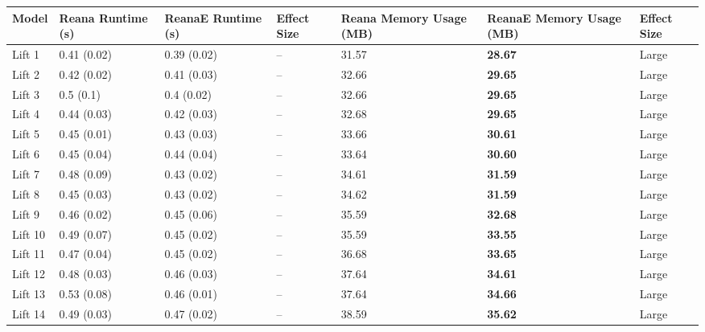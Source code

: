 \begin{tabular}{lllllll}
\toprule
   Model & Reana Runtime (s) & ReanaE Runtime (s) & Effect Size & Reana Memory Usage (MB) & ReanaE Memory Usage (MB) & Effect Size \\
\midrule
  Lift 1 &       0.41 (0.02) &        0.39 (0.02) &          -- &                   31.57 &           \textbf{28.67} &       Large \\
  Lift 2 &       0.42 (0.02) &        0.41 (0.03) &          -- &                   32.66 &           \textbf{29.65} &       Large \\
  Lift 3 &         0.5 (0.1) &         0.4 (0.02) &          -- &                   32.66 &           \textbf{29.65} &       Large \\
  Lift 4 &       0.44 (0.03) &        0.42 (0.03) &          -- &                   32.68 &           \textbf{29.65} &       Large \\
  Lift 5 &       0.45 (0.01) &        0.43 (0.03) &          -- &                   33.66 &           \textbf{30.61} &       Large \\
  Lift 6 &       0.45 (0.04) &        0.44 (0.04) &          -- &                   33.64 &           \textbf{30.60} &       Large \\
  Lift 7 &       0.48 (0.09) &        0.43 (0.02) &          -- &                   34.61 &           \textbf{31.59} &       Large \\
  Lift 8 &       0.45 (0.03) &        0.43 (0.02) &          -- &                   34.62 &           \textbf{31.59} &       Large \\
  Lift 9 &       0.46 (0.02) &        0.45 (0.06) &          -- &                   35.59 &           \textbf{32.68} &       Large \\
 Lift 10 &       0.49 (0.07) &        0.45 (0.02) &          -- &                   35.59 &           \textbf{33.55} &       Large \\
 Lift 11 &       0.47 (0.04) &        0.45 (0.02) &          -- &                   36.68 &           \textbf{33.65} &       Large \\
 Lift 12 &       0.48 (0.03) &        0.46 (0.03) &          -- &                   37.64 &           \textbf{34.61} &       Large \\
 Lift 13 &       0.53 (0.08) &        0.46 (0.01) &          -- &                   37.64 &           \textbf{34.66} &       Large \\
 Lift 14 &       0.49 (0.03) &        0.47 (0.02) &          -- &                   38.59 &           \textbf{35.62} &       Large \\

\end{tabular}
